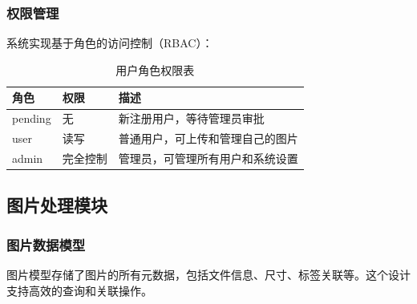 \documentclass[cs4size,a4paper]{ctexart}
\numberwithin{equation}{section}
\numberwithin{table}{section}
\numberwithin{figure}{section}
\begin{document}
\subsubsection{权限管理}

系统实现基于角色的访问控制（RBAC）：

\begin{table}[H]
    \centering
    \begin{tabular}{@{}lll@{}}
        \toprule
        角色 & 权限 & 描述 \\
        \midrule
        pending & 无 & 新注册用户，等待管理员审批 \\
        user & 读写 & 普通用户，可上传和管理自己的图片 \\
        admin & 完全控制 & 管理员，可管理所有用户和系统设置 \\
        \bottomrule
    \end{tabular}
    \caption{用户角色权限表}
\end{table}

\subsection{图片处理模块}

\subsubsection{图片数据模型}

图片模型存储了图片的所有元数据，包括文件信息、尺寸、标签关联等。这个设计支持高效的查询和关联操作。
\end{document}
